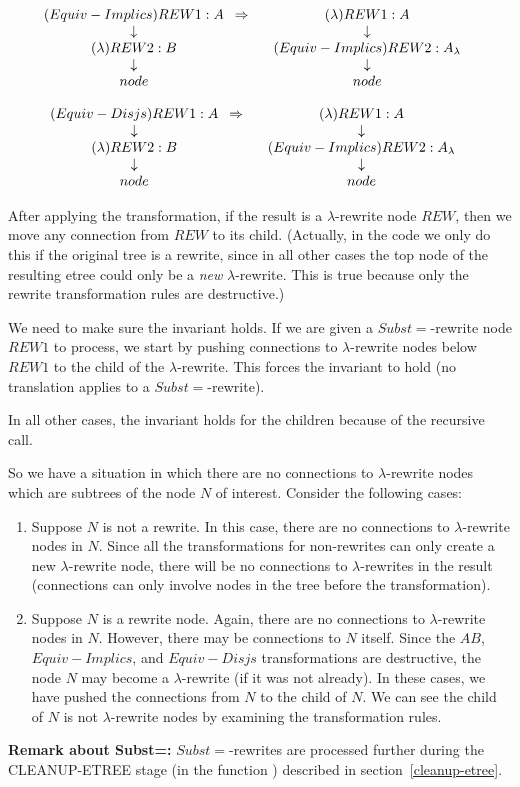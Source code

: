 $$\erew{1}{Equiv-Implics}{A}{\erew{2}{\lambda}{B}{node}} \Rightarrow
\erew{1}{\lambda}{A}{\erew{2}{Equiv-Implics}{A_\lambda}{node}}$$

$$\erew{1}{Equiv-Disjs}{A}{\erew{2}{\lambda}{B}{node}} \Rightarrow
\erew{1}{\lambda}{A}{\erew{2}{Equiv-Implics}{A_\lambda}{node}}$$

After applying the transformation, if the result is a $\lambda$-rewrite
node $REW$, then we move any connection from $REW$ to its child.
(Actually, in the code we only do this if the original tree is a rewrite,
since in all other cases the top node of the resulting etree could
only be a {\it new} $\lambda$-rewrite.  This is true because only the rewrite
transformation rules are destructive.)

We need to make sure the invariant holds.
If we are given a $Subst=$-rewrite node $REW1$ to process, we start by
pushing connections to $\lambda$-rewrite nodes below $REW1$ to the child of
the $\lambda$-rewrite.  This forces the invariant to hold (no translation applies
to a $Subst=$-rewrite).

In all other cases, the invariant holds for the children because
of the recursive call.

So we have a situation in which there are no connections to $\lambda$-rewrite nodes
which are subtrees of the node $N$ of interest.  Consider the following cases:
\begin{enumerate}
\item Suppose $N$ is not a rewrite.  In this case, there are no connections to $\lambda$-rewrite nodes
in $N$.  Since all the transformations for non-rewrites can only create a new $\lambda$-rewrite node,
there will be no connections to $\lambda$-rewrites in the result (connections can only involve
nodes in the tree before the transformation).
\item Suppose $N$ is a rewrite node.  Again, there are no connections to $\lambda$-rewrite nodes
in $N$.  However, there may be connections to $N$ itself.
Since the $AB$, $Equiv-Implics$, and $Equiv-Disjs$ transformations are destructive,
the node $N$ may become a $\lambda$-rewrite (if it was not already).  In these cases, we have pushed the connections from $N$
to the child of $N$.  We can see the child of $N$ is not $\lambda$-rewrite nodes by examining the
transformation rules.
\end{enumerate}

{\bf Remark about Subst=:}  $Subst=$-rewrites are processed further during the
CLEANUP-ETREE stage (in the function ) described in section~\ref{cleanup-etree}.

